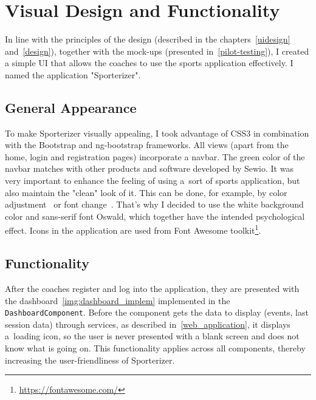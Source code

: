 \section{Visual Design and Functionality}
In line with the principles of the design (described in the chapters~\ref{uidesign} and~\ref{design}), together with the mock-ups (presented in~\ref{pilot-testing}), I created a simple UI that allows the coaches to use the sports application effectively. I named the application "Sporterizer".

\subsection{General Appearance}
To make Sporterizer visually appealing, I took advantage of CSS3 in combination with the Bootstrap and ng-bootstrap frameworks. All views (apart from the home, login and registration pages) incorporate a navbar. The green color of the navbar matches with other products and software developed by Sewio. It was very important to enhance the feeling of using a~sort of sports application, but also maintain the "clean" look of it. This can be done, for example, by color adjustment~\cite{Color} or font change~\cite{Fonts}. That’s why I decided  to use the white background color and sans-serif font Oswald, which together have the intended psychological effect. Icons in the application are used from Font Awesome toolkit\footnote{\url{https://fontawesome.com/}}.

\subsection{Functionality}
After the coaches register and log into the application, they are presented with the dashboard~\ref{img:dashboard_implem} implemented in the \texttt{DashboardComponent}. Before the component gets the data to display (events, last session data) through services, as described in~\ref{web_application}, it displays a~loading icon, so the user is never presented with a blank screen and does not know what is going on. This functionality applies across all components, thereby increasing the user-friendliness of Sporterizer.

